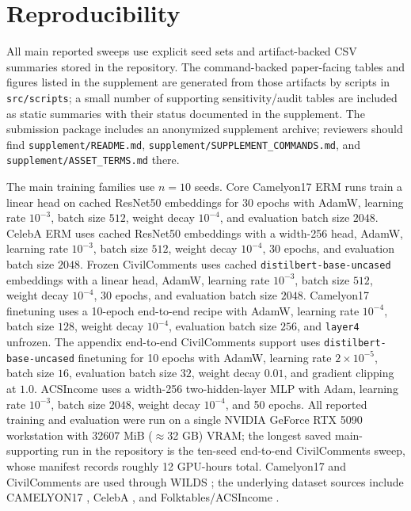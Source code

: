 \section{Reproducibility}
All main reported sweeps use explicit seed sets and artifact-backed CSV summaries stored in the repository.
The command-backed paper-facing tables and figures listed in the supplement are generated from those artifacts by scripts in \texttt{src/scripts}; a small number of supporting sensitivity/audit tables are included as static summaries with their status documented in the supplement.
The submission package includes an anonymized supplement archive; reviewers should find \texttt{supplement/README.md}, \texttt{supplement/SUPPLEMENT\_COMMANDS.md}, and \texttt{supplement/ASSET\_TERMS.md} there.

The main training families use $n=10$ seeds.
Core Camelyon17 ERM runs train a linear head on cached ResNet50 embeddings for 30 epochs with AdamW, learning rate $10^{-3}$, batch size $512$, weight decay $10^{-4}$, and evaluation batch size $2048$.
CelebA ERM uses cached ResNet50 embeddings with a width-256 head, AdamW, learning rate $10^{-3}$, batch size $512$, weight decay $10^{-4}$, 30 epochs, and evaluation batch size $2048$.
Frozen CivilComments uses cached \texttt{distilbert-base-uncased} embeddings with a linear head, AdamW, learning rate $10^{-3}$, batch size $512$, weight decay $10^{-4}$, 30 epochs, and evaluation batch size $2048$.
Camelyon17 finetuning uses a 10-epoch end-to-end recipe with AdamW, learning rate $10^{-4}$, batch size $128$, weight decay $10^{-4}$, evaluation batch size $256$, and \texttt{layer4} unfrozen.
The appendix end-to-end CivilComments support uses \texttt{distilbert-base-uncased} finetuning for 10 epochs with AdamW, learning rate $2\times10^{-5}$, batch size $16$, evaluation batch size $32$, weight decay $0.01$, and gradient clipping at $1.0$.
ACSIncome uses a width-256 two-hidden-layer MLP with Adam, learning rate $10^{-3}$, batch size $2048$, weight decay $10^{-4}$, and 50 epochs.
All reported training and evaluation were run on a single NVIDIA GeForce RTX 5090 workstation with 32607 MiB ($\approx$32 GB) VRAM; the longest saved main-supporting run in the repository is the ten-seed end-to-end CivilComments sweep, whose manifest records roughly 12 GPU-hours total.
Camelyon17 and CivilComments are used through WILDS \citep{koh2021wilds}; the underlying dataset sources include CAMELYON17 \citep{bejnordi2017camelyon}, CelebA \citep{liu2015celeba}, and Folktables/ACSIncome \citep{ding2021folktables}.
